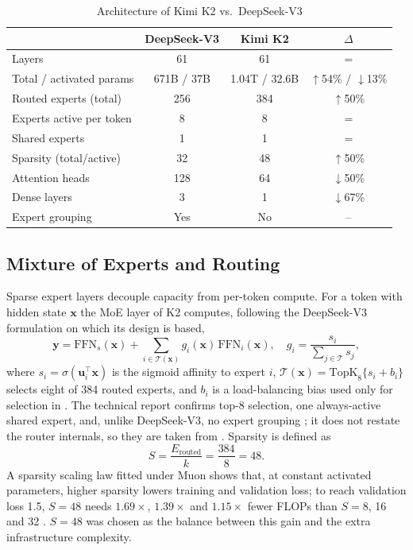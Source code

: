 \documentclass[10pt,twocolumn,letterpaper]{article}
\begin{document}
\begin{table}[!t]
\caption{Architecture of Kimi K2 vs.\ DeepSeek-V3 \cite{kimik2}}
\label{tab:arch}
\centering\footnotesize
\setlength{\tabcolsep}{4pt}
\begin{tabular}{lccc}
\toprule
 & DeepSeek-V3 & Kimi K2 & $\Delta$ \\
\midrule
Layers & 61 & 61 & = \\
Total / activated params & 671B / 37B & 1.04T / 32.6B & $\uparrow$54\% / $\downarrow$13\% \\
Routed experts (total) & 256 & 384 & $\uparrow$50\% \\
Experts active per token & 8 & 8 & = \\
Shared experts & 1 & 1 & = \\
Sparsity (total/active) & 32 & 48 & $\uparrow$50\% \\
Attention heads & 128 & 64 & $\downarrow$50\% \\
Dense layers & 3 & 1 & $\downarrow$67\% \\
Expert grouping & Yes & No & -- \\
\bottomrule
\end{tabular}
\end{table}

\subsection{Mixture of Experts and Routing}
Sparse expert layers \cite{shazeer,gshard} decouple capacity from per-token compute. For a token with hidden state $\mathbf{x}$ the MoE layer of K2 computes, following the DeepSeek-V3 formulation \cite{dsv3} on which its design is based,
\begin{equation}
\mathbf{y}=\mathrm{FFN}_{s}(\mathbf{x})+\sum_{i\in\mathcal{T}(\mathbf{x})} g_i(\mathbf{x})\,\mathrm{FFN}_i(\mathbf{x}),\quad
g_i=\frac{s_i}{\sum_{j\in\mathcal{T}}s_j},
\end{equation}
where $s_i=\sigma(\mathbf{u}_i^{\!\top}\mathbf{x})$ is the sigmoid affinity to expert $i$, $\mathcal{T}(\mathbf{x})=\mathrm{TopK}_{8}\{s_i+b_i\}$ selects eight of 384 routed experts, and $b_i$ is a load-balancing bias used only for selection in \cite{dsv3}. The technical report confirms top-8 selection, one always-active shared expert, and, unlike DeepSeek-V3, no expert grouping \cite{kimik2}; it does not restate the router internals, so they are taken from \cite{dsv3}. Sparsity is defined as
\begin{equation}
S=\frac{E_{\text{routed}}}{k}=\frac{384}{8}=48.
\end{equation}
A sparsity scaling law fitted under Muon shows that, at constant activated parameters, higher sparsity lowers training and validation loss; to reach validation loss 1.5, $S{=}48$ needs $1.69\times$, $1.39\times$ and $1.15\times$ fewer FLOPs than $S{=}8$, 16 and 32 \cite{kimik2}. $S{=}48$ was chosen as the balance between this gain and the extra infrastructure complexity.
\end{document}
